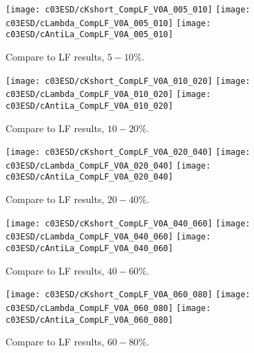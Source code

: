 \begin{figure}[htb]
\begin{center}
\texttt{[image: c03ESD/cKshort\_CompLF\_V0A\_005\_010]}
\texttt{[image: c03ESD/cLambda\_CompLF\_V0A\_005\_010]}
\texttt{[image: c03ESD/cAntiLa\_CompLF\_V0A\_005\_010]}
\caption{Compare to LF results, $5-10\%$.}
\label{fig:c03Comp005010ESD}
\end{center}
\end{figure}

\begin{figure}[htb]
\begin{center}
\texttt{[image: c03ESD/cKshort\_CompLF\_V0A\_010\_020]}
\texttt{[image: c03ESD/cLambda\_CompLF\_V0A\_010\_020]}
\texttt{[image: c03ESD/cAntiLa\_CompLF\_V0A\_010\_020]}
\caption{Compare to LF results, $10-20\%$.}
\label{fig:c03Comp010020ESD}
\end{center}
\end{figure}

\begin{figure}[htb]
\begin{center}
\texttt{[image: c03ESD/cKshort\_CompLF\_V0A\_020\_040]}
\texttt{[image: c03ESD/cLambda\_CompLF\_V0A\_020\_040]}
\texttt{[image: c03ESD/cAntiLa\_CompLF\_V0A\_020\_040]}
\caption{Compare to LF results, $20-40\%$.}
\label{fig:c03Comp020040ESD}
\end{center}
\end{figure}

\begin{figure}[htb]
\begin{center}
\texttt{[image: c03ESD/cKshort\_CompLF\_V0A\_040\_060]}
\texttt{[image: c03ESD/cLambda\_CompLF\_V0A\_040\_060]}
\texttt{[image: c03ESD/cAntiLa\_CompLF\_V0A\_040\_060]}
\caption{Compare to LF results, $40-60\%$.}
\label{fig:c03Comp040060ESD}
\end{center}
\end{figure}

\begin{figure}[htb]
\begin{center}
\texttt{[image: c03ESD/cKshort\_CompLF\_V0A\_060\_080]}
\texttt{[image: c03ESD/cLambda\_CompLF\_V0A\_060\_080]}
\texttt{[image: c03ESD/cAntiLa\_CompLF\_V0A\_060\_080]}
\caption{Compare to LF results, $60-80\%$.}
\label{fig:c03Comp060080ESD}
\end{center}
\end{figure}

